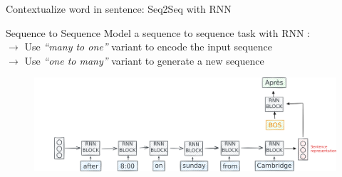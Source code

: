 \documentclass[10pt,aspectratio=169]{beamer}
\begin{document}
  \begin{frame}[noframenumbering]{Contextualize word in sentence: Seq2Seq with RNN}

    \begin{block}{Sequence to Sequence}
      \vspace{.1cm}
      {\footnotesize
        Model a sequence to sequence task with RNN :\\ 
        $\rightarrow $ Use \textit{``many to one''} variant to encode the input sequence\\
        $\rightarrow $ Use \textit{``one to many''} variant to generate a new sequence\\
      } 
    \end{block}

    \begin{figure}
      \centering
      \includegraphics[width=1.\textwidth]{img/RNN-example-seq2seq-6.pdf}
    \end{figure}


  \end{frame}
\end{document}
